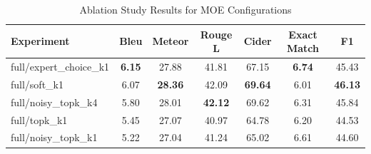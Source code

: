 \begin{table}[h]
\centering
\caption{Ablation Study Results for MOE Configurations}
\label{tab:ablation}
\begin{tabular}{lcccccc}
\toprule
Experiment & Bleu & Meteor & Rouge L & Cider & Exact Match & F1 \\
\midrule
full/expert\_choice\_k1 & \textbf{6.15} & 27.88 & 41.81 & 67.15 & \textbf{6.74} & 45.43 \\
full/soft\_k1 & 6.07 & \textbf{28.36} & 42.09 & \textbf{69.64} & 6.01 & \textbf{46.13} \\
full/noisy\_topk\_k4 & 5.80 & 28.01 & \textbf{42.12} & 69.62 & 6.31 & 45.84 \\
full/topk\_k1 & 5.45 & 27.07 & 40.97 & 64.78 & 6.20 & 44.53 \\
full/noisy\_topk\_k1 & 5.22 & 27.04 & 41.24 & 65.02 & 6.61 & 44.60 \\
\bottomrule
\end{tabular}
\end{table}